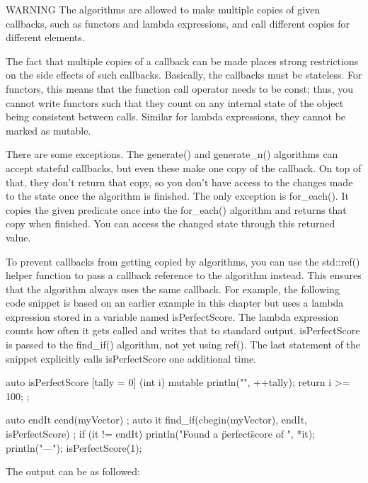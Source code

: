 
\begin{myWarning}{WARNING}
The algorithms are allowed to make multiple copies of given callbacks, such as functors and lambda expressions, and call different copies for different elements.
\end{myWarning}

The fact that multiple copies of a callback can be made places strong restrictions on the side effects of such callbacks. Basically, the callbacks must be stateless. For functors, this means that the function call operator needs to be const; thus, you cannot write functors such that they count on any internal state of the object being consistent between calls. Similar for lambda expressions, they cannot be marked as mutable.

There are some exceptions. The generate() and generate\_n() algorithms can accept stateful callbacks, but even these make one copy of the callback. On top of that, they don’t return that copy, so you don’t have access to the changes made to the state once the algorithm is finished. The only exception is for\_each(). It copies the given predicate once into the for\_each() algorithm and returns that copy when finished. You can access the changed state through this returned value.

To prevent callbacks from getting copied by algorithms, you can use the std::ref() helper function to pass a callback reference to the algorithm instead. This ensures that the algorithm always uses the same callback. For example, the following code snippet is based on an earlier example in this chapter but uses a lambda expression stored in a variable named isPerfectScore. The lambda expression counts how often it gets called and writes that to standard output. isPerfectScore is passed to the find\_if() algorithm, not yet using ref(). The last statement of the snippet explicitly calls isPerfectScore one additional time.

\begin{cpp}
auto isPerfectScore { [tally = 0] (int i) mutable {
        println("{}", ++tally); return i >= 100; } };

auto endIt { cend(myVector) };
auto it { find_if(cbegin(myVector), endIt, isPerfectScore) };
if (it != endIt) { println("Found a \"perfect\" score of {}", *it); }
println("---");
isPerfectScore(1);
\end{cpp}

The output can be as followed:

